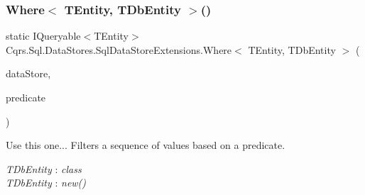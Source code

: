 \subsubsection{\texorpdfstring{Where$<$ T\+Entity, T\+Db\+Entity $>$()}{Where< TEntity, TDbEntity >()}}
{\footnotesize\ttfamily static I\+Queryable$<$T\+Entity$>$ Cqrs.\+Sql.\+Data\+Stores.\+Sql\+Data\+Store\+Extensions.\+Where$<$ T\+Entity, T\+Db\+Entity $>$ (\begin{DoxyParamCaption}\item[{this \hyperlink{interfaceCqrs_1_1DataStores_1_1IDataStore}{I\+Data\+Store}$<$ T\+Entity $>$}]{data\+Store,  }\item[{Expression$<$ Func$<$ T\+Entity, bool $>$$>$}]{predicate }\end{DoxyParamCaption})\hspace{0.3cm}{\ttfamily [static]}}



Use this one... Filters a sequence of values based on a predicate. 

\begin{Desc}
\item[Type Constraints]\begin{description}
\item[{\em T\+Db\+Entity} : {\em class}]\item[{\em T\+Db\+Entity} : {\em new()}]\end{description}
\end{Desc}
